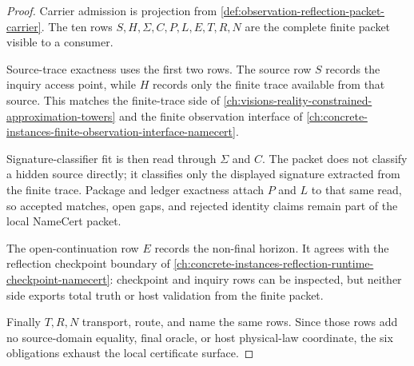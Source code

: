 \begin{proof}
Carrier admission is projection from \autoref{def:observation-reflection-packet-carrier}. The ten rows $S,H,\Sigma,C,P,L,E,T,R,N$ are the complete finite packet visible to a consumer.

Source-trace exactness uses the first two rows. The source row $S$ records the inquiry access point, while $H$ records only the finite trace available from that source. This matches the finite-trace side of \autoref{ch:visions-reality-constrained-approximation-towers} and the finite observation interface of \autoref{ch:concrete-instances-finite-observation-interface-namecert}.

Signature-classifier fit is then read through $\Sigma$ and $C$. The packet does not classify a hidden source directly; it classifies only the displayed signature extracted from the finite trace. Package and ledger exactness attach $P$ and $L$ to that same read, so accepted matches, open gaps, and rejected identity claims remain part of the local NameCert packet.

The open-continuation row $E$ records the non-final horizon. It agrees with the reflection checkpoint boundary of \autoref{ch:concrete-instances-reflection-runtime-checkpoint-namecert}: checkpoint and inquiry rows can be inspected, but neither side exports total truth or host validation from the finite packet.

Finally $T,R,N$ transport, route, and name the same rows. Since those rows add no source-domain equality, final oracle, or host physical-law coordinate, the six obligations exhaust the local certificate surface.
\end{proof}

